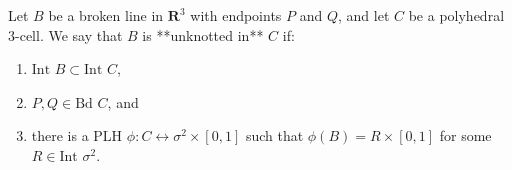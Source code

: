 Let $B$ be a broken line in $\mathbf{R}^3$ with endpoints $P$ and $Q$, and let $C$ be a polyhedral 3-cell. We say that $B$ is **unknotted in** $C$ if:
\begin{enumerate}
\item $\text{Int } B \subset \text{Int } C$,
\item $P, Q \in \text{Bd } C$, and
\item there is a PLH $\phi: C \leftrightarrow \sigma^2 \times [0, 1]$ such that $\phi(B) = R \times [0, 1]$ for some $R \in \text{Int } \sigma^2$.
\end{enumerate}

